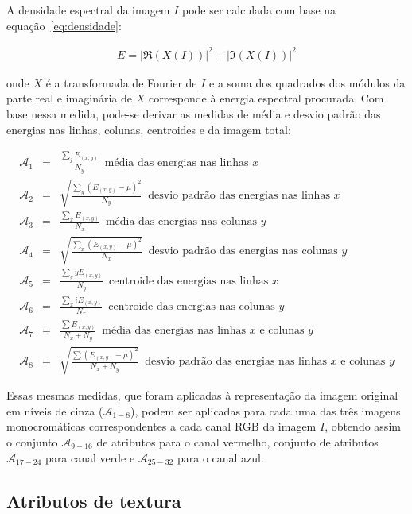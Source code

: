 A densidade espectral da imagem $I$ pode ser calculada com base na equação~\ref{eq:densidade}:

\begin{eqnarray}
  E = |\Re(X(I))|^2 + |\Im(X(I))|^2
\end{eqnarray}

\noindent onde $X$ é a transformada de Fourier de $I$ e a soma dos quadrados dos
módulos da parte real e imaginária de $X$ corresponde à energia espectral
procurada. Com base nessa medida, pode-se derivar as medidas de média e desvio
padrão das energias nas linhas, colunas, centroides e da imagem total:

\begin{eqnarray}
  \mathcal{A}_1 &=& \frac{\sum_j E_{(x,y)}}{N_y} \, \, \, \text{média das energias
    nas linhas $x$} \\
  \mathcal{A}_2 &=& \sqrt{\frac{\sum_y (E_{(x,y)} - \mu)^2}{N_y}} \, \, \,
  \text{desvio padrão das energias nas linhas $x$} \\
  \mathcal{A}_3 &=& \frac{\sum_x E_{(x,y)}}{N_x} \, \, \, \text{média das energias
    nas colunas $y$} \\
  \mathcal{A}_4 &=& \sqrt{\frac{\sum_x (E_{(x,y)} - \mu)^2}{N_x}} \, \, \,
  \text{desvio padrão das energias nas colunas $y$} \\
  \mathcal{A}_5 &=& \frac{\sum_y y E_{(x,y)}}{N_y} \, \, \, \text{centroide das energias
    nas linhas $x$} \\
  \mathcal{A}_6 &=& \frac{\sum_x i E_{(x,y)}}{N_x} \, \, \, \text{centroide das energias
    nas colunas $y$} \\
  \mathcal{A}_7 &=& \frac{\sum E_{(x,y)}}{N_x + N_y} \, \, \, \text{média das energias
    nas linhas $x$ e colunas $y$} \\
  \mathcal{A}_8 &=& \sqrt{\frac{\sum (E_{(x,y)} - \mu)^2}{N_x + N_y}} \, \, \,
  \text{desvio padrão das energias nas linhas $x$ e colunas $y$}
\end{eqnarray}

Essas mesmas medidas, que foram aplicadas à representação da imagem
original em níveis de cinza ($\mathcal{A}_{1-8}$), podem ser aplicadas
para cada uma das três imagens monocromáticas correspondentes a cada
canal RGB da imagem $I$, obtendo assim o conjunto $\mathcal{A}_{9-16}$
de atributos para o canal vermelho, conjunto de atributos
$\mathcal{A}_{17-24}$ para canal verde e $\mathcal{A}_{25-32}$ para o
canal azul.

\subsection{Atributos de textura}

